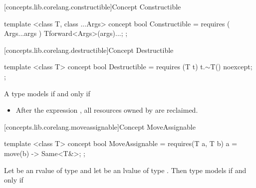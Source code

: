 \begin{addedblock}
[concepts.lib.corelang.constructible]{Concept Constructible}

%
\begin{itemdecl}
template <class T, class ...Args>
concept bool Constructible =
  requires ( Args...args ) {
    T{forward<Args>(args)...};
  };
\end{itemdecl}

[concepts.lib.corelang.destructible]{Concept Destructible}

%
\begin{itemdecl}
template <class T>
concept bool Destructible =
  requires (T t) {
    { t.$\sim$T() } noexcept;
  };
\end{itemdecl}

\begin{itemdescr}

\pnum
A type  models  if and only if

\begin{itemize}
\item After the expression , all resources owned by  are
reclaimed.
\end{itemize}
\end{itemdescr}

[concepts.lib.corelang.moveassignable]{Concept MoveAssignable}

%
\begin{itemdecl}
template <class T>
concept bool MoveAssignable =
  requires(T a, T b) {
    { a = move(b) } -> Same<T&>;
  };
\end{itemdecl}

\begin{itemdescr}
\pnum
Let  be an rvalue of type 
and let  be an lvalue of type . Then type  models
 if and only if


\end{itemdescr}
\end{addedblock}

